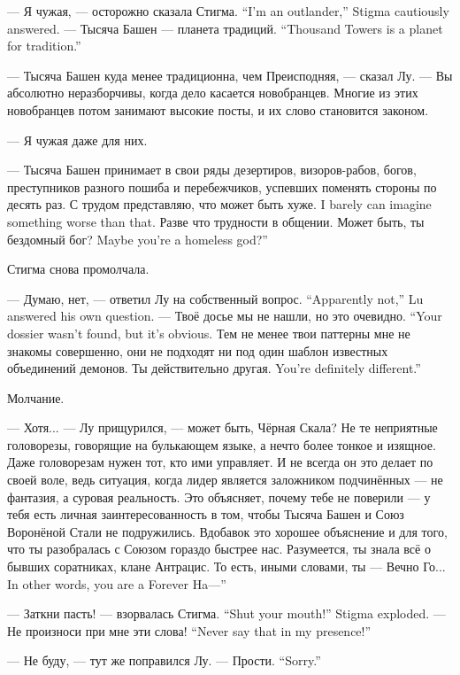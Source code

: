 {--- Я чужая, --- осторожно сказала Стигма.}
{``I'm an outlander,'' Stigma cautiously answered.}
{--- Тысяча Башен --- планета традиций.}
{``Thousand Towers is a planet for tradition.''}

--- Тысяча Башен куда менее традиционна, чем Преисподняя, --- сказал Лу.
--- Вы абсолютно неразборчивы, когда дело касается новобранцев.
Многие из этих новобранцев потом занимают высокие посты, и их слово становится законом.

--- Я чужая даже для них.

--- Тысяча Башен принимает в свои ряды дезертиров, визоров-рабов, богов, преступников разного пошиба и перебежчиков, успевших поменять стороны по десять раз.
{С трудом представляю, что может быть хуже.}
{I barely can imagine something worse than that.}
Разве что трудности в общении.
{Может быть, ты бездомный бог?}
{Maybe you're a homeless god?''}

Стигма снова промолчала.

{--- Думаю, нет, --- ответил Лу на собственный вопрос.}
{``Apparently not,'' Lu answered his own question.}
{--- Твоё досье мы не нашли, но это очевидно.}
{``Your dossier wasn't found, but it's obvious.}
Тем не менее твои паттерны мне не знакомы совершенно, они не подходят ни под один шаблон известных объединений демонов.
{Ты действительно другая.}
{You're definitely different.''}

Молчание.

--- Хотя... --- Лу прищурился, --- может быть, Чёрная Скала?
Не те неприятные головорезы, говорящие на булькающем языке, а нечто более тонкое и изящное.
Даже головорезам нужен тот, кто ими управляет.
И не всегда он это делает по своей воле, ведь ситуация, когда лидер является заложником подчинённых --- не фантазия, а суровая реальность.
Это объясняет, почему тебе не поверили --- у тебя есть личная заинтересованность в том, чтобы Тысяча Башен и Союз Воронёной Стали не подружились.
Вдобавок это хорошее объяснение и для того, что ты разобралась с Союзом гораздо быстрее нас.
Разумеется, ты знала всё о бывших соратниках, клане Антрацис.
{То есть, иными словами, ты --- Вечно Го...}
{In other words, you are a Forever Ha---''}

{--- Заткни пасть! --- взорвалась Стигма.}
{``Shut your mouth!'' Stigma exploded.}
{--- Не произноси при мне эти слова!}
{``Never say that in my presence!''}

--- Не буду, --- тут же поправился Лу.
{--- Прости.}
{``Sorry.''}

